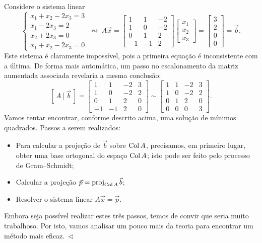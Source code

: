 \documentclass[../livro.tex]{subfiles}  %
\begin{document}
\begin{example}\label{exp:minquad1}
  Considere o sistema linear
  \[
  \left\{
    \begin{array}{ll}
      x_1 + x_2 - 2x_3 = 3 \\
      x_1  - 2x_3 = 2 \\
      x_2 + 2x_3 = 0 \\
      x_1 + x_2 - 2x_3 = 0
    \end{array}
  \right. \ \leftrightsquigarrow  \
  A \vec{x} = \begin{bmatrix}
    1 & 1 & -2 \\ 1 & 0 & -2 \\ 0 & 1 & 2 \\ -1 & -1 & 2
  \end{bmatrix}
  \begin{bmatrix}
    x_1 \\ x_2 \\ x_3
  \end{bmatrix} =
  \begin{bmatrix}
    3 \\ 2 \\ 0 \\ 0
  \end{bmatrix} = \vec{b}.
  \] Este sistema é claramente impossível, pois a primeira equação é inconsistente com a última. De forma mais automática, um passo no escalonamento da matriz aumentada associada revelaria a mesma conclusão:
  \[
  [\, A \ | \ \vec{b} \, ] = \begin{bmatrix}
    1 & 1 & -2 & 3 \\ 1 & 0 & -2 & 2 \\ 0 & 1 & 2 & 0 \\ -1 & -1 & 2 & 0
  \end{bmatrix}   \sim
  \begin{bmatrix}
    1 & 1 & -2 & 3 \\ 1 & 0 & -2 & 2 \\ 0 & 1 & 2 & 0 \\ 0 & 0 & 0 & 3
  \end{bmatrix} .
  \] Vamos tentar encontrar, conforme descrito acima, uma solução de mínimos quadrados. Passos a serem realizados:
  \begin{itemize}
  \item Para calcular a projeção de $\vec{b}$ sobre $\operatorname{Col} A$, precisamos, em primeiro lugar, obter uma base ortogonal do espaço $\operatorname{Col} A$; isto pode ser feito pelo processo de Gram--Schmidt;
  \item Calcular a projeção $\vec{p} = \operatorname{proj}_{\operatorname{Col} A} \vec{b}$;
  \item Resolver o sistema linear $A \vec{x} = \vec{p}$.
  \end{itemize} Embora seja possível realizar estes três passos, temos de convir que seria muito trabalhoso. Por isto, vamos analisar um pouco mais da teoria para encontrar um método mais eficaz$. \ \lhd$
\end{example}
\end{document}
